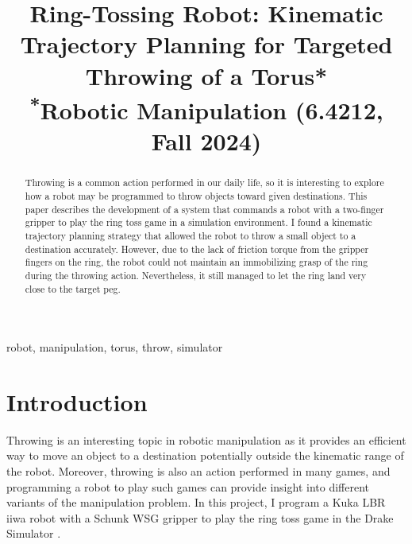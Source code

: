 \documentclass[conference]{IEEEtran}
\begin{document}
\title{Ring-Tossing Robot: Kinematic Trajectory Planning for Targeted Throwing of a Torus*\\
{\footnotesize \textsuperscript{*}Robotic Manipulation (6.4212, Fall 2024)}}
\author{
}

\maketitle

\begin{abstract}
Throwing is a common action performed in our daily life, so it is interesting to explore how a robot may be programmed to throw objects toward given destinations. This paper describes the development of a system that commands a robot with a two-finger gripper to play the ring toss game in a simulation environment. I found a kinematic trajectory planning strategy that allowed the robot to throw a small object to a destination accurately. However, due to the lack of friction torque from the gripper fingers on the ring, the robot could not maintain an immobilizing grasp of the ring during the throwing action. Nevertheless, it still managed to let the ring land very close to the target peg.
\end{abstract}

\begin{IEEEkeywords}
robot, manipulation, torus, throw, simulator
\end{IEEEkeywords}

\section{Introduction}
Throwing is an interesting topic in robotic manipulation as it provides an efficient way to move an object to a destination potentially outside the kinematic range of the robot. Moreover, throwing is also an action performed in many games, and programming a robot to play such games can provide insight into different variants of the manipulation problem. In this project, I program a Kuka LBR iiwa robot with a Schunk WSG gripper to play the ring toss game in the Drake Simulator \cite{drake}.
\end{document}
